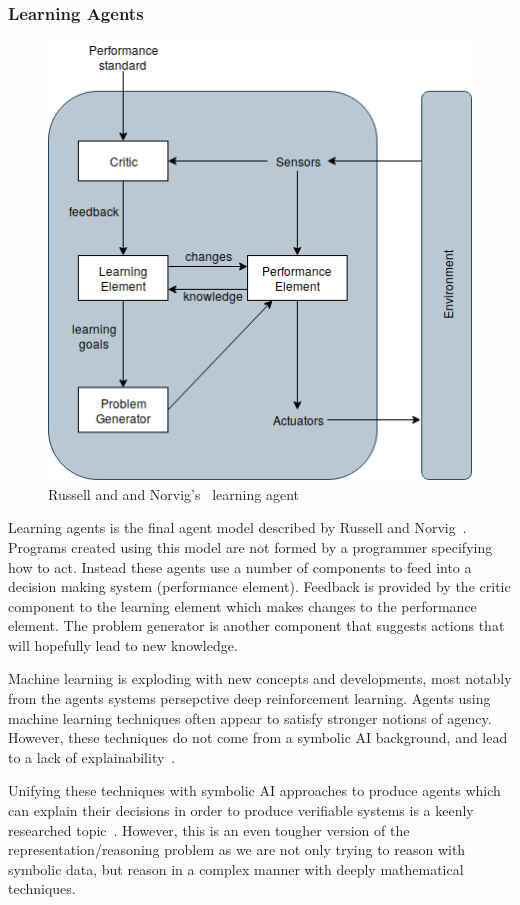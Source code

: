 \documentclass[]{final_report}
\begin{document}
\subsubsection{Learning Agents}
\begin{figure}
\vspace{-20pt}
\begin{framed}
	\center
	\includegraphics[width=\textwidth]{LearningAgent.png}
	\caption{Russell and and Norvig's~\cite{russell2016artificial} learning agent}
	\label{fig:learning}
\end{framed}
\vspace{-25pt}
\end{figure}
Learning agents is the final agent model described by Russell and Norvig~\cite{russell2016artificial}. Programs created using this model are not formed by a programmer specifying how to act. Instead these agents use a number of components to feed into a decision making system (performance element). Feedback is provided by the critic component to the learning element which makes changes to the performance element. The problem generator is another component that suggests actions that will hopefully lead to new knowledge.\par 
Machine learning is exploding with new concepts and developments, most notably from the agents systems persepctive deep reinforcement learning. Agents using machine learning techniques often appear to satisfy stronger notions of agency. However, these techniques do not come from a symbolic AI background, and lead to a lack of explainability~\cite{darpaxai}.\par 
Unifying these techniques with symbolic AI approaches to produce agents which can explain their decisions in order to produce verifiable systems is a keenly researched topic~\cite{darpaxai, garnelo2016towards}. However, this is an even tougher version of the representation/reasoning problem as we are not only trying to reason with symbolic data, but reason in a complex manner with deeply mathematical techniques.
\end{document}
